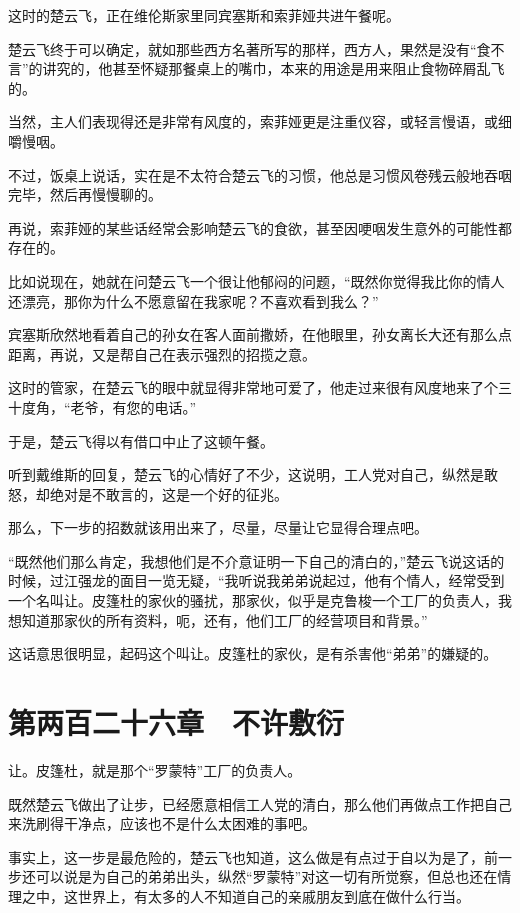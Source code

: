 这时的楚云飞，正在维伦斯家里同宾塞斯和索菲娅共进午餐呢。

楚云飞终于可以确定，就如那些西方名著所写的那样，西方人，果然是没有“食不言”的讲究的，他甚至怀疑那餐桌上的嘴巾，本来的用途是用来阻止食物碎屑乱飞的。

当然，主人们表现得还是非常有风度的，索菲娅更是注重仪容，或轻言慢语，或细嚼慢咽。

不过，饭桌上说话，实在是不太符合楚云飞的习惯，他总是习惯风卷残云般地吞咽完毕，然后再慢慢聊的。

再说，索菲娅的某些话经常会影响楚云飞的食欲，甚至因哽咽发生意外的可能性都存在的。

比如说现在，她就在问楚云飞一个很让他郁闷的问题，“既然你觉得我比你的情人还漂亮，那你为什么不愿意留在我家呢？不喜欢看到我么？”

宾塞斯欣然地看着自己的孙女在客人面前撒娇，在他眼里，孙女离长大还有那么点距离，再说，又是帮自己在表示强烈的招揽之意。

这时的管家，在楚云飞的眼中就显得非常地可爱了，他走过来很有风度地来了个三十度角，“老爷，有您的电话。”

于是，楚云飞得以有借口中止了这顿午餐。

听到戴维斯的回复，楚云飞的心情好了不少，这说明，工人党对自己，纵然是敢怒，却绝对是不敢言的，这是一个好的征兆。

那么，下一步的招数就该用出来了，尽量，尽量让它显得合理点吧。

“既然他们那么肯定，我想他们是不介意证明一下自己的清白的，”楚云飞说这话的时候，过江强龙的面目一览无疑，“我听说我弟弟说起过，他有个情人，经常受到一个名叫让。皮篷杜的家伙的骚扰，那家伙，似乎是克鲁梭一个工厂的负责人，我想知道那家伙的所有资料，呃，还有，他们工厂的经营项目和背景。”

这话意思很明显，起码这个叫让。皮篷杜的家伙，是有杀害他“弟弟”的嫌疑的。

\section{第两百二十六章　不许敷衍}

让。皮篷杜，就是那个“罗蒙特”工厂的负责人。

既然楚云飞做出了让步，已经愿意相信工人党的清白，那么他们再做点工作把自己来洗刷得干净点，应该也不是什么太困难的事吧。

事实上，这一步是最危险的，楚云飞也知道，这么做是有点过于自以为是了，前一步还可以说是为自己的弟弟出头，纵然“罗蒙特”对这一切有所觉察，但总也还在情理之中，这世界上，有太多的人不知道自己的亲戚朋友到底在做什么行当。

